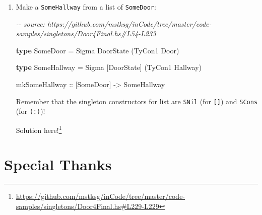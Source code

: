 \documentclass[]{article}
\newenvironment{Shaded}{}{}
\newcommand{\CommentTok}[1]{\textcolor[rgb]{0.38,0.63,0.69}{\textit{#1}}}
\newcommand{\DataTypeTok}[1]{\textcolor[rgb]{0.56,0.13,0.00}{#1}}
\newcommand{\KeywordTok}[1]{\textcolor[rgb]{0.00,0.44,0.13}{\textbf{#1}}}
\newcommand{\NormalTok}[1]{#1}
\newcommand{\OperatorTok}[1]{\textcolor[rgb]{0.40,0.40,0.40}{#1}}
\newcommand{\OtherTok}[1]{\textcolor[rgb]{0.00,0.44,0.13}{#1}}
\renewcommand{\href}[2]{#2\footnote{\url{#1}}}
\begin{document}
\begin{enumerate}
\begin{Shaded}
\begin{Highlighting}[]
\KeywordTok{type} \DataTypeTok{Map}\NormalTok{ f xs }\OtherTok{=} \DataTypeTok{Foldr} \OperatorTok{????} \OperatorTok{????}\NormalTok{ xs}
\end{Highlighting}
\end{Shaded}

  Try to mirror the value-level definition, passing in \texttt{(:)\ .\ f}, and
  use the promoted version of \texttt{(.)} from the \emph{singletons} library,
  in
  \emph{\href{http://hackage.haskell.org/package/singletons-2.5/docs/Data-Singletons-Prelude.html}{Data.Singletons.Prelude}}.
  You might find \texttt{TyCon2} helpful!

  \href{https://github.com/mstksg/inCode/tree/master/code-samples/singletons/Door4Final.hs\#L229-L229}{Solution
  here!}
\item
  Make a \texttt{SomeHallway} from a list of \texttt{SomeDoor}:

\begin{Shaded}
\begin{Highlighting}[]
\CommentTok{{-}{-} source: https://github.com/mstksg/inCode/tree/master/code{-}samples/singletons/Door4Final.hs\#L54{-}L233}

\KeywordTok{type} \DataTypeTok{SomeDoor} \OtherTok{=} \DataTypeTok{Sigma} \DataTypeTok{DoorState}\NormalTok{ (}\DataTypeTok{TyCon1} \DataTypeTok{Door}\NormalTok{)}

\KeywordTok{type} \DataTypeTok{SomeHallway} \OtherTok{=} \DataTypeTok{Sigma}\NormalTok{ [}\DataTypeTok{DoorState}\NormalTok{] (}\DataTypeTok{TyCon1} \DataTypeTok{Hallway}\NormalTok{)}

\OtherTok{mkSomeHallway ::}\NormalTok{ [}\DataTypeTok{SomeDoor}\NormalTok{] }\OtherTok{{-}\textgreater{}} \DataTypeTok{SomeHallway}
\end{Highlighting}
\end{Shaded}

  Remember that the singleton constructors for list are \texttt{SNil} (for
  \texttt{{[}{]}}) and \texttt{SCons} (for \texttt{(:)})!

  \href{https://github.com/mstksg/inCode/tree/master/code-samples/singletons/Door4Final.hs\#L229-L229}{Solution
  here!}
\end{enumerate}

\section{Special Thanks}\label{special-thanks}
\end{document}

